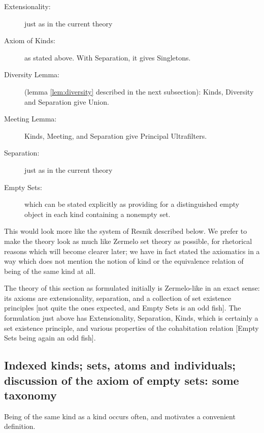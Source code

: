 \documentclass[12pt]{article}
\begin{document}
 \begin{description}
 
 \item[Extensionality:]  just as in the current theory
 
 \item[Axiom of Kinds:]  as stated above.  With Separation, it gives Singletons.
 
 \item[Diversity Lemma:] (lemma \ref{lem:diversity} described in the next subsection):  Kinds, Diversity and Separation give Union.
 
 \item[Meeting Lemma:]  Kinds, Meeting, and Separation give Principal Ultrafilters.
 
 \item[Separation:]  just as in the current theory
 
 \item[Empty Sets:]  which can be stated explicitly as providing for a distinguished empty object in each kind containing a nonempty set.
 
 \end{description}
 
 This would look more like the system of Resnik described below.  We prefer to make the theory look as much like Zermelo set theory as possible, for rhetorical reasons which will become clearer later; we have in fact stated the axiomatics in a way which does not mention the notion of kind or the equivalence relation of being of the same kind at all.
 
 The theory of this section as formulated initially is Zermelo-like in an exact sense:  its axioms are extensionality, separation, and a collection of set existence principles [not quite the ones expected, and Empty Sets is an odd fish].  The formulation just above has Extensionality, Separation, Kinds, which is certainly a set existence principle, and various properties of the cohabitation relation [Empty Sets being again an odd fish].



\subsection{Indexed kinds; sets, atoms and individuals; discussion of the axiom of empty sets: some taxonomy}

  Being of the same kind as a kind occurs often, and motivates a convenient definition.
\end{document}
